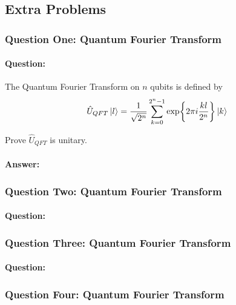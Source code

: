 \documentclass[reprint, amsmath,amssymb, aps]{revtex4-2}
\begin{document}
        \subsection{Extra Problems}
            \subsubsection{Question One: Quantum Fourier Transform}
                \paragraph{Question:}
                The Quantum Fourier Transform on $n$ qubits is defined by
                \begin{equation*}
                     \hat{U}_{QFT}\ket{l} = \frac{1}{\sqrt{2^n}}\sum\limits_{k=0}^{2^n-1}\exp{2\pi i\frac{kl}{2^n}}\ket{k}
                \end{equation*}

                Prove $\hat{U}_{QFT}$ is unitary.

                \begin{mdframed}
                    \paragraph{Answer:}
                    
                \end{mdframed}

            \subsubsection{Question Two: Quantum Fourier Transform}
                \paragraph{Question:}

            \subsubsection{Question Three: Quantum Fourier Transform}
                \paragraph{Question:}

            \subsubsection{Question Four: Quantum Fourier Transform}
\end{document}
